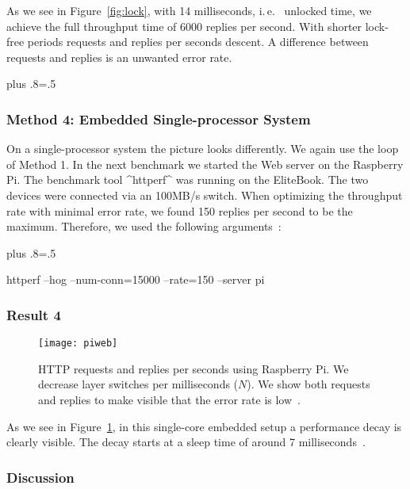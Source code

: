 As we see in Figure~\ref{fig:lock}, with 14 milliseconds,
\newcommand{\unlocktime}{\p{58.3}}
i.\,e.\ \unlocktime{}
unlocked time, we achieve the full throughput time of 6000 replies per second.
With shorter lock-free periods requests and replies per seconds descent.
A difference between requests and replies is an unwanted error rate.%
{\parfillskip=0pt plus .8\textwidth \emergencystretch=.5\textwidth \par}

\subsubsection{Method 4: Embedded Single-processor System}

On a single-processor system the picture looks differently.
We again use the loop of Method 1.
In the next benchmark we started the Web server on the Raspberry Pi.
The benchmark tool ^httperf^ was running on the EliteBook.
The two devices were connected via an 100MB/s switch.
When optimizing the throughput rate with minimal error rate, we found 150 replies per second to be the maximum.
Therefore, we used the following arguments~\cite{raab2015global}:%
{\parfillskip=0pt plus .8\textwidth \emergencystretch=.5\textwidth \par}

\begin{code}[language=bash,numbers=none]
httperf --hog --num-conn=15000 --rate=150 --server pi
\end{code}

\subsubsection{Result 4}

\begin{figure}[htp]
\centering
\texttt{[image: piweb]}
\caption[Raspberry Pi: HTTP requests and replies.]{HTTP requests and replies per seconds using Raspberry Pi.
We decrease layer switches per milliseconds ($N$).
We show both requests and replies to make visible that the error rate is low~\cite{raab2015global}.}
\label{fig:piweb}
\end{figure}

As we see in Figure~\ref{fig:piweb}, in this single-core embedded setup a performance decay is clearly visible.
The decay starts at a sleep time of around 7 milliseconds~\cite{raab2015global}.

\subsubsection{Discussion}

